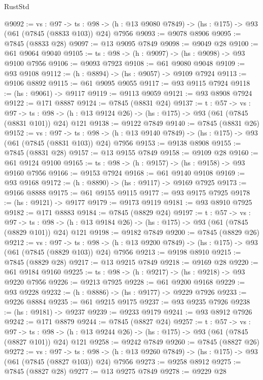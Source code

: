 \begin{lexlean}{RustStd}
\begin{coremodule}
@9092 := {vs : @97} ->
  {ts : @98} -> (h : @13 @9080 @7849) -> (hs : @175) -> @93 (@61 (@7845 (@8833 @103)) @24) @7956
@9093 := @9078 @8906
@9095 := @7845 (@8833 @28)
@9097 := @13 @9095 @7849
@9098 := @9049 @28
@9100 := @61 @9064 @9040
@9105 := {ts : @98} -> (h : @9097) -> (hs : @9098) -> @93 @9100 @7956
@9106 := @9093 @7923
@9108 := @61 @9080 @9048
@9109 := @93 @9108
@9112 := (h : @8894) -> (hs : @9057) -> @9109 @7924
@9113 := @9106 @8892
@9115 := @61 @9095 @9055
@9117 := @93 @9115 @7924
@9118 := (hs : @9061) -> @9117
@9119 := @9113 @9059
@9121 := @93 @8908 @7924
@9122 := @171 @8887
@9124 := @7845 (@8831 @24)
@9137 := {t : @57} ->
  {vs : @97} ->
  {ts : @98} -> (h : @13 @9124 @26) -> (hs : @175) -> @93 (@61 (@7845 (@8831 @101)) @24) @121
@9138 := @9122 @7849
@9140 := @7845 (@8831 @26)
@9152 := {vs : @97} ->
  {ts : @98} -> (h : @13 @9140 @7849) -> (hs : @175) -> @93 (@61 (@7845 (@8831 @103)) @24) @7956
@9153 := @9138 @8908
@9155 := @7845 (@8831 @28)
@9157 := @13 @9155 @7849
@9158 := @9109 @28
@9160 := @61 @9124 @9100
@9165 := {ts : @98} -> (h : @9157) -> (hs : @9158) -> @93 @9160 @7956
@9166 := @9153 @7924
@9168 := @61 @9140 @9108
@9169 := @93 @9168
@9172 := (h : @8890) -> (hs : @9117) -> @9169 @7925
@9173 := @9166 @8888
@9175 := @61 @9155 @9115
@9177 := @93 @9175 @7925
@9178 := (hs : @9121) -> @9177
@9179 := @9173 @9119
@9181 := @93 @8910 @7925
@9182 := @171 @8883
@9184 := @7845 (@8829 @24)
@9197 := {t : @57} ->
  {vs : @97} ->
  {ts : @98} -> (h : @13 @9184 @26) -> (hs : @175) -> @93 (@61 (@7845 (@8829 @101)) @24) @121
@9198 := @9182 @7849
@9200 := @7845 (@8829 @26)
@9212 := {vs : @97} ->
  {ts : @98} -> (h : @13 @9200 @7849) -> (hs : @175) -> @93 (@61 (@7845 (@8829 @103)) @24) @7956
@9213 := @9198 @8910
@9215 := @7845 (@8829 @28)
@9217 := @13 @9215 @7849
@9218 := @9169 @28
@9220 := @61 @9184 @9160
@9225 := {ts : @98} -> (h : @9217) -> (hs : @9218) -> @93 @9220 @7956
@9226 := @9213 @7925
@9228 := @61 @9200 @9168
@9229 := @93 @9228
@9232 := (h : @8886) -> (hs : @9177) -> @9229 @7926
@9233 := @9226 @8884
@9235 := @61 @9215 @9175
@9237 := @93 @9235 @7926
@9238 := (hs : @9181) -> @9237
@9239 := @9233 @9179
@9241 := @93 @8912 @7926
@9242 := @171 @8879
@9244 := @7845 (@8827 @24)
@9257 := {t : @57} ->
  {vs : @97} ->
  {ts : @98} -> (h : @13 @9244 @26) -> (hs : @175) -> @93 (@61 (@7845 (@8827 @101)) @24) @121
@9258 := @9242 @7849
@9260 := @7845 (@8827 @26)
@9272 := {vs : @97} ->
  {ts : @98} -> (h : @13 @9260 @7849) -> (hs : @175) -> @93 (@61 (@7845 (@8827 @103)) @24) @7956
@9273 := @9258 @8912
@9275 := @7845 (@8827 @28)
@9277 := @13 @9275 @7849
@9278 := @9229 @28

\end{coremodule}
\end{lexlean}

